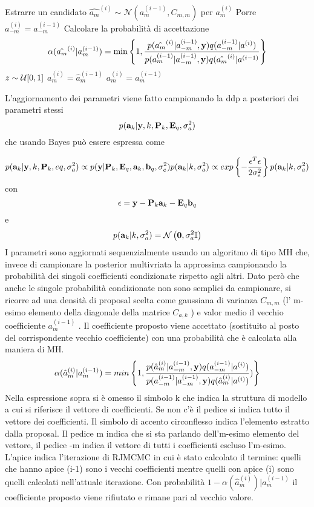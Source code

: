 \begin{algorithmic}
\State Estrarre un candidato $\hat{a_m}^{(i)}\sim\mathcal{N}(a_m^{(i-1)},C_{m,m})$ per $a_m^{(i)}$ 
\State Porre $a_{-m}^{(i)}=a_{-m}^{(i-1)}$
\State Calcolare la probabilità di accettazione
\[
\alpha(\hat{a_m}^{(i)}|a_m^{(i-1)})=\min\left\lbrace 1, \frac{p(\hat{a_m}^{(i)}|a_{-m}^{(i-1)},\textbf{y}) q(a_{-m}^{(i-1)}|a^{(i)})}{p(a_m^{(i-1)}|a_{-m}^{(i-1)},\textbf{y})q(\hat{a_m}^{(i)}|a^{(i-1)}} \right\rbrace
\]
\State $z\sim\mathcal{U}[0,1]$
\State $a_m^{(i)}=\hat{a}_m^{(i-1)}$
\Else
\State $a_m^{(i)}=a_m^{(i-1)}$
\EndIf
\EndFor
\end{algorithmic}
L’aggiornamento dei parametri viene fatto campionando la ddp a posteriori dei
parametri stessi
\begin{equation}
p(\textbf{a}_k|\textbf{y},k,\textbf{P}_k,\textbf{E}_q,\sigma_a^2)
\end{equation}
che usando Bayes può essere espressa come

\begin{equation}
p(\textbf{a}_k|\textbf{y},k,\textbf{P}_k,eq,\sigma_a^2)\propto p(\textbf{y}|\textbf{P}_k,\textbf{E}_q,\textbf{a}_k,\textbf{b}_q,\sigma_e^2)p(\textbf{a}_k|k,\sigma_a^2)\propto exp\left\lbrace- \frac{\epsilon^T\epsilon}{2\sigma_e^2}\right\rbrace p(\textbf{a}_k|k,\sigma_a^2)
\end{equation}
con
\begin{equation}
\epsilon=\textbf{y}-\textbf{P}_k\textbf{a}_k-\textbf{E}_q\textbf{b}_q
\end{equation}
e
\begin{equation}
p(\textbf{a}_k|k,\sigma_a^2)=\mathcal{N}\left(\textbf{0},\sigma_a^2 \mathbb{I}\right)
\end{equation}
I parametri sono aggiornati sequenzialmente usando un algoritmo di tipo MH che,
invece di campionare la posterior multivriata la approssima campionando la probabilità dei singoli coefficienti condizionate rispetto agli altri. Dato però che anche le
singole probabilità condizionate non sono semplici da campionare, si ricorre ad una
densità di proposal scelta come gaussiana di varianza $C_{m,m}$ (l’ m-esimo elemento
della diagonale della matrice $C_{a,k}$ ) e valor medio il vecchio coefficiente $a_m^{(i-1)}$ . Il
coefficiente proposto viene accettato (sostituito al posto del corrispondente vecchio
coefficiente) con una probabilità che è calcolata alla maniera di MH.
\begin{equation}
\alpha(\hat{a}_m^{(i)}|a_m^{(i-1)})=min\left\lbrace 1,\frac{p(\hat{a}_m^{(i)}|a_{-m}^{(i-1)},\textbf{y})q(a_{-m}^{(i-1)}|a^{(i)})}
{p(a_{-m}^{(i-1)}|a_{-m}^{(i-1)},\textbf{y})q(\hat{a}_m^{(i)}|a^{(i)})})\right\rbrace
\end{equation}
Nella espressione sopra si è omesso il simbolo k che indica la struttura di modello a
cui si riferisce il vettore di coefficienti. Se non c’è il pedice si indica tutto il vettore
dei coefficienti. Il simbolo di accento circonflesso indica l’elemento estratto dalla
proposal. Il pedice m indica che si sta parlando dell’m-esimo elemento del vettore,
il pedice -m indica il vettore di tutti i coefficienti escluso l’m-esimo. L’apice indica
l’iterazione di RJMCMC in cui è stato calcolato il termine: quelli che hanno apice
(i-1) sono i vecchi coefficienti mentre quelli con apice (i) sono quelli calcolati
nell’attuale iterazione. Con probabilità $1-\alpha(\hat{a}_m^{(i)})|a_m^{(i-1)}$ il coefficiente proposto
viene rifiutato e rimane pari al vecchio valore.
